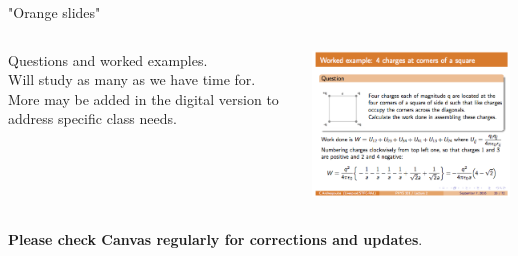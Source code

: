 %
%
%


\begin{frame}{"Orange slides"}

\begin{columns}
  \begin{column}{0.30\textwidth}
   \begin{center}
      Questions and worked examples.\\
      \vspace{0.2cm}
      Will study as many as we have time for.
      More may be added in the digital version to address specific class needs.\\
   \end{center}
  \end{column}
  \begin{column}{0.70\textwidth}
   \begin{center}
     \includegraphics[width=0.99\textwidth]{./images/example_slides/worked_example.png}\\
   \end{center}
  \end{column}
\end{columns}

\vspace{0.2cm}

\begin{center}
 {\bf Please check Canvas regularly for corrections and updates}.\\
\end{center}

\end{frame}

%
%
%

